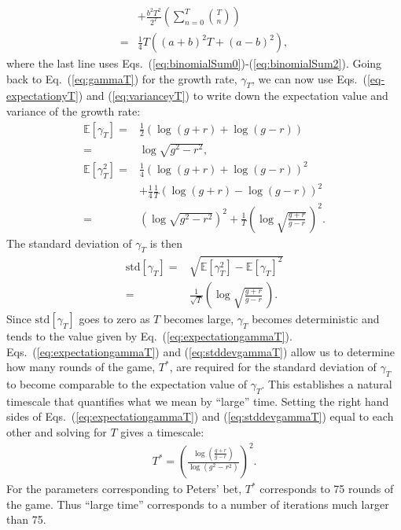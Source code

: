 \documentclass[11pt]{article}
\begin{document}
\begin{multicols}{2}
\begin{align}
\nonumber &  + \frac{b^2 T^2}{2^T} \left( \sum_{n=0}^T  {T \choose n} \right) \\ 
\label{eq:varianceyT} = & \frac{1}{4} T \left( (a + b)^2 T  + (a-b)^2\right),
\end{align}
where the last line uses Eqs.~(\ref{eq:binomialSum0})-(\ref{eq:binomialSum2}).
Going back to Eq.~(\ref{eq:gammaT}) for the growth rate, $\gamma_T$, we can now use Eqs.~(\ref{eq-expectationyT}) and (\ref{eq:varianceyT}) to write down the expectation value and variance of the growth rate:
\begin{align}
\nonumber \mathbb{E}\left[ \gamma_T \right] = & \frac{1}{2} \left(\log (g+r) + \log (g-r)\right)\\
\label{eq:expectationgammaT} =& \log \sqrt{g^2 - r^2},\\
\nonumber \mathbb{E}\left[ \gamma_T^2 \right] = &  \frac{1}{4}  \left(\log (g+r) + \log (g-r)\right)^2\\
\nonumber & + \frac{1}{4}\frac{1}{T} \left(\log (g+r) - \log (g-r)\right)^2\\
\label{eq:variancegammaT} =&  \left(\log \sqrt{g^2 - r^2}\right)^2 + \frac{1}{T} \left( \log \sqrt{\frac{g+r}{g-r}}\,\right)^2.
\end{align}
The standard deviation of $\gamma_T$ is then
\begin{align}
\nonumber  \text{std}\left[ \gamma_T\right] = & \sqrt{ \mathbb{E}\left[\gamma_T^2 \right]  -  \mathbb{E}\left[\gamma_T \right]^2 }\\
\label{eq:stddevgammaT} = &  \frac{1}{\sqrt{T}} \left( \log \sqrt{\frac{g+r}{g-r}}\,\right).
\end{align}
Since $\text{std}\left[ \gamma_T\right]$ goes to zero as $T$ becomes large,  $\gamma_T$ becomes deterministic and tends to the value given by Eq.~(\ref{eq:expectationgammaT}).
Eqs.~(\ref{eq:expectationgammaT}) and (\ref{eq:stddevgammaT}) allow us to determine how many rounds of the game, $T^*$, are required for the standard deviation of $\gamma_T$ to become comparable to the expectation value of $\gamma_T$. This establishes a natural timescale that quantifies what we mean by ``large'' time.  Setting the right hand sides of Eqs.~(\ref{eq:expectationgammaT}) and (\ref{eq:stddevgammaT}) equal to each other and solving for $T$ gives a timescale:
\begin{align}
T^* = \left( \frac{\log\left(\frac{g+r}{g-r}\right)}{ \log\left(g^2 - r^2 \right)}\right)^2.
\end{align}
For the parameters corresponding to Peters' bet, $T^*$ corresponds to 75 rounds of the game. Thus ``large time'' corresponds to a number of iterations much larger than 75.


\end{multicols}
\end{document}
